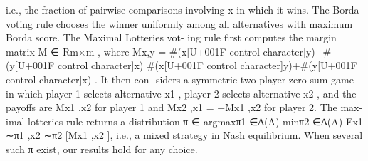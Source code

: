 \documentclass[10pt]{article}
\begin{document}
\begin{ReviewVerbatim}
i.e., the fraction of pairwise comparisons involving x in which it wins. The Borda voting rule chooses
the winner uniformly among all alternatives with maximum Borda score. The Maximal Lotteries vot-
ing rule first computes the margin matrix M ∈ Rm×m , where Mx,y = #(x[U+001F control character]y)−#(y[U+001F control character]x)
                                                                          #(x[U+001F control character]y)+#(y[U+001F control character]x) . It then con-
siders a symmetric two-player zero-sum game in which player 1 selects alternative x1 , player 2 selects
alternative x2 , and the payoffs are Mx1 ,x2 for player 1 and Mx2 ,x1 = −Mx1 ,x2 for player 2. The max-
imal lotteries rule returns a distribution π ∈ argmaxπ1 ∈∆(A) minπ2 ∈∆(A) Ex1 ∼π1 ,x2 ∼π2 [Mx1 ,x2 ],
i.e., a mixed strategy in Nash equilibrium. When several such π exist, our results hold for any choice.
\end{ReviewVerbatim}
\end{document}
